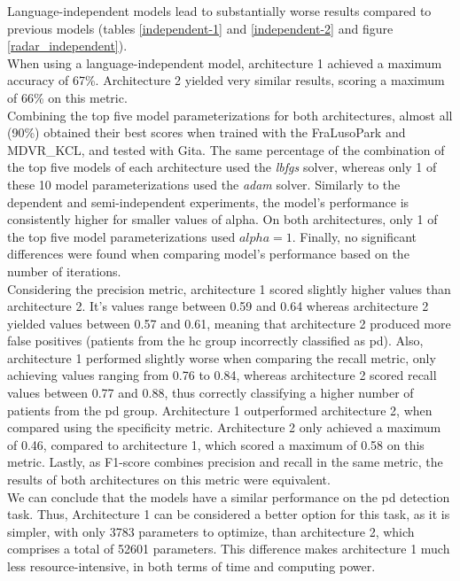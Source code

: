 Language-independent models lead to substantially worse results compared to previous models (tables \ref{independent-1} and \ref{independent-2} and figure \ref{radar_independent}). \\
When using a language-independent model, architecture 1 achieved a maximum accuracy of 67\%. Architecture 2 yielded very similar results, scoring a maximum of 66\% on this metric. \\
Combining the top five model parameterizations for both architectures, almost all (90\%) obtained their best scores when trained with the FraLusoPark and MDVR\_KCL, and tested with Gita. The same percentage of the combination of the top five models of each architecture used the \textit{lbfgs} solver, whereas only 1 of these 10 model parameterizations used the \textit{adam} solver. Similarly to the dependent and semi-independent experiments, the model's performance is consistently higher for smaller values of alpha. On both architectures, only 1 of the top five model parameterizations used $alpha = 1$. Finally, no significant differences were found when comparing model's performance based on the number of iterations. \\
Considering the precision metric, architecture 1 scored slightly higher values than architecture 2. It's values range between 0.59 and 0.64 whereas architecture 2 yielded values between 0.57 and 0.61, meaning that architecture 2 produced more false positives (patients from the \gls{hc} group incorrectly classified as \gls{pd}). Also, architecture 1 performed slightly worse when comparing the recall metric, only achieving values ranging from 0.76 to 0.84, whereas architecture 2 scored recall values between 0.77 and 0.88, thus correctly classifying a higher number of patients from the \gls{pd} group. Architecture 1 outperformed architecture 2, when compared using the specificity metric. Architecture 2 only achieved a maximum of 0.46, compared to architecture 1, which scored a maximum of 0.58 on this metric. Lastly, as F1-score combines precision and recall in the same metric, the results of both architectures on this metric were equivalent. \\
We can conclude that the models have a similar performance on the \gls{pd} detection task. Thus, Architecture 1 can be considered a better option for this task, as it is simpler, with only 3783 parameters to optimize, than architecture 2, which comprises a total of 52601 parameters. This difference makes architecture 1 much less resource-intensive, in both terms of time and computing power.

